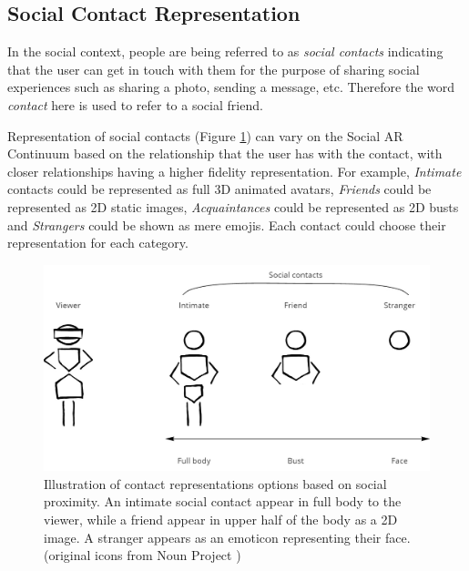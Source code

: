 \subsection{Social Contact Representation}

In the social context, people are being referred to as \textit{social contacts} indicating that the user can get in touch with them for the purpose of sharing social experiences such as sharing a photo, sending a message, etc. Therefore the word \textit{contact} here is used to refer to a social friend. 

Representation of social contacts (Figure \ref{fig:continuum:contact-representations}) can vary on the Social AR Continuum based on the relationship that the user has with the contact, with closer relationships having a higher fidelity representation. For example, \textit{Intimate} contacts could be represented as full 3D animated avatars, \textit{Friends} could be represented as 2D static images, \textit{Acquaintances} could be represented as 2D busts and \textit{Strangers} could be shown as mere emojis. Each contact could choose their representation for each category.

\begin{figure}[ht]
    \centering
    \includegraphics[width=0.8\linewidth]{images/30-continuum/Continuum-representation.jpg}
    \caption{Illustration of contact representations options based on social proximity. An intimate social contact appear in full body to the viewer, while a friend appear in upper half of the body as a 2D image. A stranger appears as an emoticon representing their face. (original icons from Noun Project \cite{TheNounProjectInc.})}
    \label{fig:continuum:contact-representations}
\end{figure}


